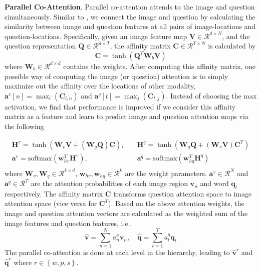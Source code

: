 \documentclass{article}
\begin{document}
\textbf{Parallel Co-Attention}. Parallel co-attention attends to the image and question simultaneously. Similar to \cite{xu2015ask}, we connect the image and question by calculating the similarity between image and question features at all pairs of image-locations and question-locations. Specifically, given an image feature map $\bm{{V}} \in \mathcal{R}^{d \times N}$, and the question representation $\bm{{Q}} \in \mathcal{R}^{d \times T}$, the affinity matrix $\bm{C} \in \mathcal{R}^{T \times N}$ is calculated by
\begin{equation}
\bm{C} = \tanh(\bm{Q}^T \bm{W}_{b} \bm{V})
\end{equation}
where $\bm{W}_b \in \mathcal{R}^{d \times d}$ contains the weights. After computing this affinity matrix, one possible way of computing the image (or question) attention is to simply maximize out the affinity over the locations of other modality, \ie $\bm{a}^v[n] = \max_i(\bm{C}_{i,n}) $ and $\bm{a}^q[t] = \max_j(\bm{C}_{t,j})$. 
Instead of choosing the max activation, we find that performance is improved if we consider this affinity matrix as a feature and learn to predict image and question attention maps via the following

\begin{equation}
\begin{aligned}
\bm{H}^v = \tanh(\bm{W}_v \bm{V} + (\bm{W}_{q} \bm{Q})\bm{C}) , &\quad \bm{H}^q = \tanh(\bm{W}_q \bm{Q} + (\bm{W}_{v} \bm{V}) \bm{C}^T) \\ 
\bm{a}^v = \textrm{softmax}(\bm{w}_{hv}^T \bm{H}^v) , &\quad \bm{a}^q = \textrm{softmax}(\bm{w}_{hq}^T \bm{H}^q)\\
\end{aligned}
\end{equation}
where $\bm{W}_v, \bm{W}_q \in \mathcal{R}^{k \times d}$, $\bm{w}_{hv}, \bm{w}_{hq} \in \mathcal{R}^k$ are the weight parameters. $\bm{a}^v \in \mathcal{R}^N$ and $\bm{a}^q \in \mathcal{R}^T$ are the attention probabilities of each image region $\bm{v}_n$ and word $\bm{q}_t$ respectively. The affinity matrix $\bm{C}$ transforms question attention space to image attention space (vice versa for $\bm{C}^T$).
Based on the above attention weights, the image and question attention vectors are calculated as the weighted sum of the image features and question features, i.e.,
\begin{equation}
\hat{\bm{v}} = \sum_{n = 1}^{N} a^v_n \bm{v}_n,  \quad  \hat{\bm{q}} = \sum_{t=1}^{T} a^q_t \bm{q}_t
\end{equation}
The parallel co-attention is done at each level in the hierarchy, leading to $\hat{\bm{v}}^{r}$ and $\hat{\bm{q}}^{r}$ where $r \in \left\lbrace w, p, s \right\rbrace$.
\end{document}

